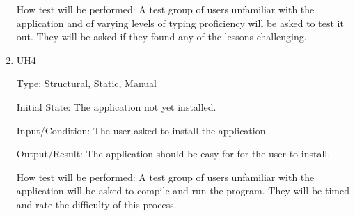\documentclass[12pt, titlepage]{article}
\begin{document}
\begin{enumerate}
How test will be performed:  A test group of users unfamiliar with the application and of varying levels of typing proficiency will be asked to test it out.{\color{cyan} They will be asked if they found any of the lessons challenging.}

\item{{\color{cyan}UH4}\\}

Type: Structural, Static, Manual
					
Initial State: The application not yet installed.
					
Input/Condition: The user asked to install the application.
					
Output/Result: The application should be easy for for the user to install.
					
How test will be performed:  A test group of users unfamiliar with the application will be asked to {\color{cyan} compile and run the program. They will be timed and rate the difficulty of this process.}

\end{enumerate}
\end{document}
